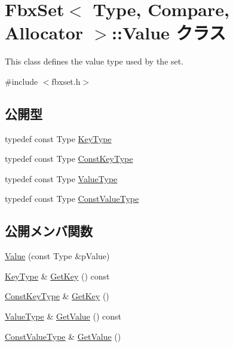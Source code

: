 \hypertarget{class_fbx_set_1_1_value}{}\section{Fbx\+Set$<$ Type, Compare, Allocator $>$\+:\+:Value クラス}
\label{class_fbx_set_1_1_value}


This class defines the value type used by the set.  




{\ttfamily \#include $<$fbxset.\+h$>$}

\subsection*{公開型}
\begin{DoxyCompactItemize}
\item 
typedef const Type \hyperlink{class_fbx_set_1_1_value_ad4958bd8730776f19c1309f457158acf}{Key\+Type}
\item 
typedef const Type \hyperlink{class_fbx_set_1_1_value_a184e74f6d42151d97b2c1381b5f642e7}{Const\+Key\+Type}
\item 
typedef const Type \hyperlink{class_fbx_set_1_1_value_aa4757d6676c438c18ab271c57997d8eb}{Value\+Type}
\item 
typedef const Type \hyperlink{class_fbx_set_1_1_value_a4b01735d9b84587bb21bd4a9d75e419b}{Const\+Value\+Type}
\end{DoxyCompactItemize}
\subsection*{公開メンバ関数}
\begin{DoxyCompactItemize}
\item 
\hyperlink{class_fbx_set_1_1_value_a3503d6fb6173a58a0b8b93c8413710c1}{Value} (const Type \&p\+Value)
\item 
\hyperlink{class_fbx_set_1_1_value_ad4958bd8730776f19c1309f457158acf}{Key\+Type} \& \hyperlink{class_fbx_set_1_1_value_a498538bf1bf1d1c9fd4b85853e92ff62}{Get\+Key} () const
\item 
\hyperlink{class_fbx_set_1_1_value_a184e74f6d42151d97b2c1381b5f642e7}{Const\+Key\+Type} \& \hyperlink{class_fbx_set_1_1_value_a9fe85101a41e5883c6f0d7fc8eaa4cf3}{Get\+Key} ()
\item 
\hyperlink{class_fbx_set_1_1_value_aa4757d6676c438c18ab271c57997d8eb}{Value\+Type} \& \hyperlink{class_fbx_set_1_1_value_a6043b78df834e7911e14e7bcd76889cc}{Get\+Value} () const
\item 
\hyperlink{class_fbx_set_1_1_value_a4b01735d9b84587bb21bd4a9d75e419b}{Const\+Value\+Type} \& \hyperlink{class_fbx_set_1_1_value_ae91a4001845b34f06c36b1e6fe966bf4}{Get\+Value} ()
\end{DoxyCompactItemize}
